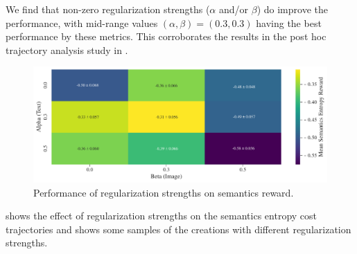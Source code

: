 We find that non-zero regularization strengths (\(\alpha\) and/or \(\beta\)) do improve the performance, with mid-range values \((\alpha, \beta) = (0.3, 0.
3)\) having the best performance by these metrics.
This corroborates the results in the post hoc trajectory analysis study in .

\begin{figure}[H]
    \centering
    \includegraphics[width=\textwidth]{images/alpha_beta-semantics_rair_with_std.pdf}
    \caption{Performance of regularization strengths on semantics reward.}
    \label{fig:alpha-beta-semantics}
\end{figure}

 shows the effect of regularization strengths on the semantics entropy cost trajectories and  shows some samples of the creations with different regularization strengths.

